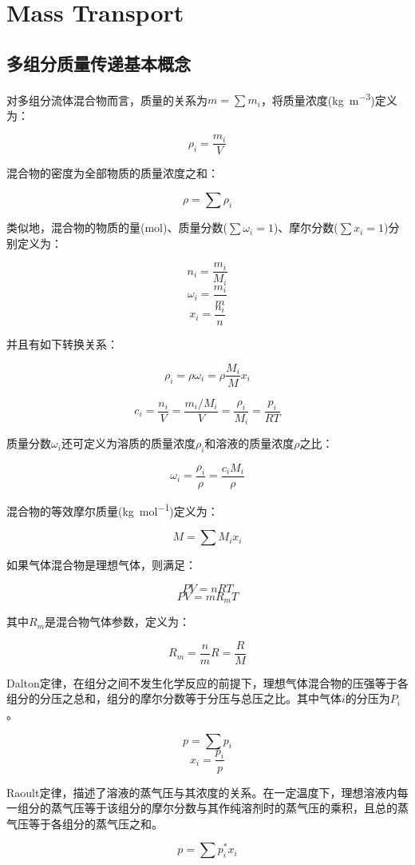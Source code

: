 \chapter{Mass Transport}

\section{多组分质量传递基本概念}

对多组分流体混合物而言，质量的关系为$ m=\sum m_i $，将质量浓度(\si{\kilogram\per\meter\cubed})定义为：

\[\rho_i = \frac{m_i}{V} \]

混合物的密度为全部物质的质量浓度之和：

\[\rho = \sum\rho_i \]

类似地，混合物的物质的量(\si{\mole})、质量分数($ \sum \omega_i = 1 $)、摩尔分数($ \sum x_i = 1 $)分别定义为：

\[ n_i=\frac{m_i}{M_i} \]
\[ \omega_i = \frac{m_i}{m} \]
\[ x_i = \frac{n_i}{n} \]

并且有如下转换关系：

\[\rho_i = \rho\omega_i = \rho\frac{M_i}{M}x_i \]

\[c_i = \frac{n_i}{V} = \frac{m_i/M_i}{V} = \frac{\rho_i}{M_i}  = \frac{p_i}{RT} \]

质量分数$ \omega_i $还可定义为溶质的质量浓度$ \rho_i $和溶液的质量浓度$ \rho $之比：

\[\omega_i = \frac{\rho_i}{\rho} =\frac{c_i M_i}{\rho}\]

混合物的等效摩尔质量(\si{\kilogram\per\mole})定义为：

\[ M = \sum M_i x_i \]

如果气体混合物是理想气体，则满足：

\[ PV=nRT \]
\[ PV=mR_m T \]

其中$ R_m $是混合物气体参数，定义为：

\[ R_m = \frac{n}{m}R = \frac{R}{M} \]

Dalton定律，在组分之间不发生化学反应的前提下，理想气体混合物的压强等于各组分的分压之总和，组分的摩尔分数等于分压与总压之比。其中气体$ i $的分压为$ P_i $。

\[ p=\sum p_i \]
\[x_i = \frac{p_i}{p}\]

Raoult定律，描述了溶液的蒸气压与其浓度的关系。在一定温度下，理想溶液内每一组分的蒸气压等于该组分的摩尔分数与其作纯溶剂时的蒸气压的乘积，且总的蒸气压等于各组分的蒸气压之和。

\begin{equation}
p = \sum p_i^* x_i
\end{equation}


